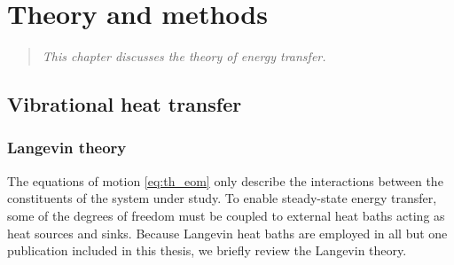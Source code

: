 \chapter{Theory and methods}

\begin{quote}
 \textit{This chapter discusses the theory of energy transfer.}
\end{quote}


\section{Vibrational heat transfer}







\subsection{Langevin theory} 
\label{sec:th_langevin}
The equations of motion \eqref{eq:th_eom} only describe the interactions between the constituents of the system under study. To enable steady-state energy transfer, some of the degrees of freedom must be coupled to external heat baths acting as heat sources and sinks. Because Langevin heat baths are employed in all but one publication included in this thesis, we briefly review the Langevin theory.


